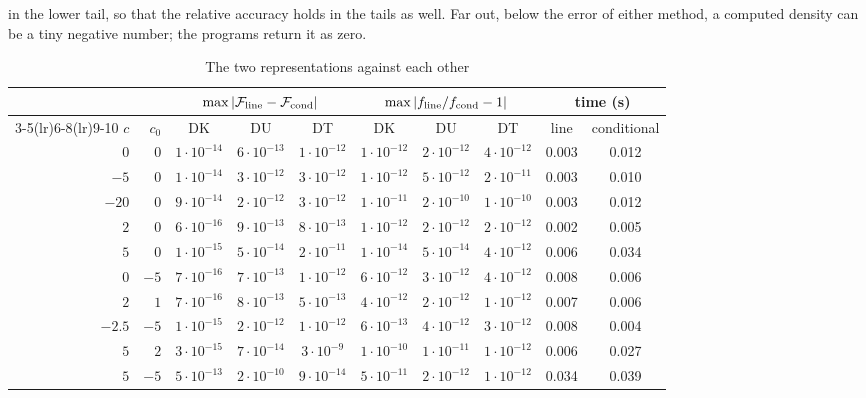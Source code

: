 \documentclass[ecta,nameyear,final,supplement]{econsocart}
\newcommand{\Fk}{\textsf{\upshape DK}}
\newcommand{\Fu}{\textsf{\upshape DU}}
\newcommand{\Ft}{\textsf{\upshape DT}}
\newcommand{\cF}{\mathcal{F}}
\theoremstyle{plain}
\theoremstyle{definition}
\begin{document}
in the lower tail, so that the relative accuracy holds in the tails as well.  Far out, below the error of either method, a computed density can be a tiny negative number; the programs return it as zero.

\begin{table}[tbp]
\caption{The two representations against each other}
\label{tab:acc}
\begin{center}
\footnotesize
\setlength{\tabcolsep}{4pt}
\begin{tabular}{rrcccccccc}
\toprule
 & & \multicolumn{3}{c}{$\max|\cF_{\rm line}-\cF_{\rm cond}|$} & \multicolumn{3}{c}{$\max|f_{\rm line}/f_{\rm cond}-1|$} & \multicolumn{2}{c}{time (s)}\\
\cmidrule(lr){3-5}\cmidrule(lr){6-8}\cmidrule(lr){9-10}
$c$ & $c_0$ & \Fk & \Fu & \Ft & \Fk & \Fu & \Ft & line & conditional\\
\midrule
$0$ & $0$ & $1\cdot10^{-14}$ & $6\cdot10^{-13}$ & $1\cdot10^{-12}$ & $1\cdot10^{-12}$ & $2\cdot10^{-12}$ & $4\cdot10^{-12}$ & 0.003 & 0.012\\
$-5$ & $0$ & $1\cdot10^{-14}$ & $3\cdot10^{-12}$ & $3\cdot10^{-12}$ & $1\cdot10^{-12}$ & $5\cdot10^{-12}$ & $2\cdot10^{-11}$ & 0.003 & 0.010\\
$-20$ & $0$ & $9\cdot10^{-14}$ & $2\cdot10^{-12}$ & $3\cdot10^{-12}$ & $1\cdot10^{-11}$ & $2\cdot10^{-10}$ & $1\cdot10^{-10}$ & 0.003 & 0.012\\
$2$ & $0$ & $6\cdot10^{-16}$ & $9\cdot10^{-13}$ & $8\cdot10^{-13}$ & $1\cdot10^{-12}$ & $2\cdot10^{-12}$ & $2\cdot10^{-12}$ & 0.002 & 0.005\\
$5$ & $0$ & $1\cdot10^{-15}$ & $5\cdot10^{-14}$ & $2\cdot10^{-11}$ & $1\cdot10^{-14}$ & $5\cdot10^{-14}$ & $4\cdot10^{-12}$ & 0.006 & 0.034\\
$0$ & $-5$ & $7\cdot10^{-16}$ & $7\cdot10^{-13}$ & $1\cdot10^{-12}$ & $6\cdot10^{-12}$ & $3\cdot10^{-12}$ & $4\cdot10^{-12}$ & 0.008 & 0.006\\
$2$ & $1$ & $7\cdot10^{-16}$ & $8\cdot10^{-13}$ & $5\cdot10^{-13}$ & $4\cdot10^{-12}$ & $2\cdot10^{-12}$ & $1\cdot10^{-12}$ & 0.007 & 0.006\\
$-2.5$ & $-5$ & $1\cdot10^{-15}$ & $2\cdot10^{-12}$ & $1\cdot10^{-12}$ & $6\cdot10^{-13}$ & $4\cdot10^{-12}$ & $3\cdot10^{-12}$ & 0.008 & 0.004\\
$5$ & $2$ & $3\cdot10^{-15}$ & $7\cdot10^{-14}$ & $3\cdot10^{-9}$ & $1\cdot10^{-10}$ & $1\cdot10^{-11}$ & $1\cdot10^{-12}$ & 0.006 & 0.027\\
$5$ & $-5$ & $5\cdot10^{-13}$ & $2\cdot10^{-10}$ & $9\cdot10^{-14}$ & $5\cdot10^{-11}$ & $2\cdot10^{-12}$ & $1\cdot10^{-12}$ & 0.034 & 0.039\\

\end{tabular}
\end{center}
\end{table}
\end{document}
